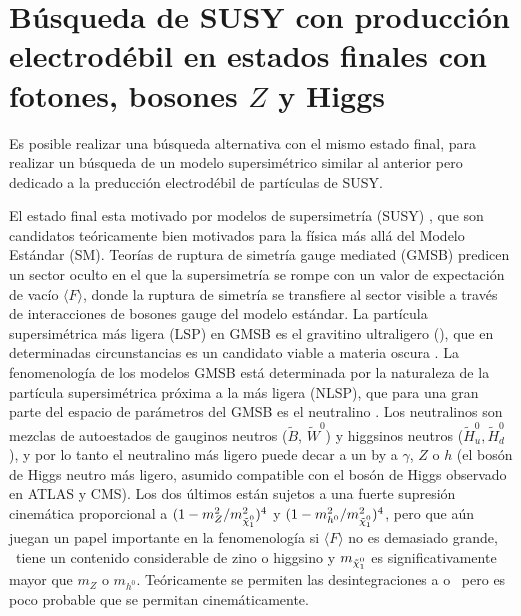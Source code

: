 \chapter{Búsqueda de SUSY con producción electrodébil en estados finales con fotones, bosones $Z$ y Higgs}



Es posible realizar una búsqueda alternativa con el mismo estado final, para realizar un búsqueda de un modelo supersimétrico similar al anterior pero dedicado a la preducción electrodébil de partículas de SUSY.

El estado final esta motivado por modelos de supersimetría (SUSY) \cite{Golfand:1971iw, Volkov:1973ix, Wess:1974tw, Wess:1974jb, Ferrara:1974pu, Salam:1974ig, Martin:1997ns}, que son candidatos teóricamente bien motivados para la física más allá del Modelo Estándar (SM). Teorías de ruptura de simetría gauge mediated (GMSB) \cite{Dine:1981gu, AlvarezGaume:1981wy, Nappi:1982hm} predicen un sector oculto en el que la supersimetría se rompe con un valor de expectación de vacío $ \langle F \rangle $, donde la ruptura de simetría se transfiere al sector visible a través de interacciones de bosones gauge del modelo estándar. La partícula supersimétrica más ligera (LSP) en GMSB es el gravitino ultraligero (\gravino), que en determinadas circunstancias es un candidato viable a materia oscura \cite{Goldberg:1983nd, Ellis:1983ew}. La fenomenología de los modelos GMSB está determinada por la naturaleza de la partícula supersimétrica próxima a la más ligera (NLSP), que para una gran parte del espacio de parámetros del GMSB es el neutralino \ninoone. Los neutralinos son mezclas de autoestados de gauginos neutros ($\tilde{B}$, $\tilde{W}^{0}$) y higgsinos neutros ($\tilde{H}^{0}_{u},\tilde{H}^{0}_{d}$), y por lo tanto el neutralino más ligero puede decar a un \gravino by a $\gamma$, $Z$ o $h$ (el bosón de Higgs neutro más ligero, asumido compatible con el bosón de Higgs observado en ATLAS y CMS). Los dos últimos están sujetos a una fuerte supresión cinemática proporcional a $ (1-m_{Z}^{2}/m_{\ninoone}^{2})^4$ y $(1-m_{h^{0}}^{2}/m_{\ninoone}^{2})^4$, pero que aún juegan un papel importante en la fenomenología si $ \langle F \rangle $ no es demasiado grande, \ninoone\ tiene un contenido considerable de zino o higgsino y $m_{\ninoone}$ es significativamente mayor que $m_{Z}$ o $m_{h^{0}}$. Teóricamente se permiten las desintegraciones a \Azero o \Hzero \, pero es poco probable que se permitan cinemáticamente.

